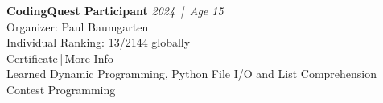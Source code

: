 \documentclass[a4paper,9pt]{extarticle}
\newcommand{\entryheader}[3]{%
    \noindent\textbf{#1} \hfill \textit{#2 \,|\, Age #3}
}
\begin{document}
    \noindent
    \entryheader{CodingQuest Participant}{2024}{15} \\
    Organizer: Paul Baumgarten \\
    Individual Ranking: 13/2144 globally \\
    \href{https://github.com/godCoderXYZ/CV/blob/main/public/CodingQuest/certificate-Y11V1MicahSHAW-2024challenge.pdf}{Certificate}\,|\,\href{https://github.com/godCoderXYZ/CV/blob/main/public/CodingQuest/codingquest.pdf}{More Info} \\
    Learned Dynamic Programming, Python File I/O and List Comprehension \\
    Contest Programming \\
\end{document}
